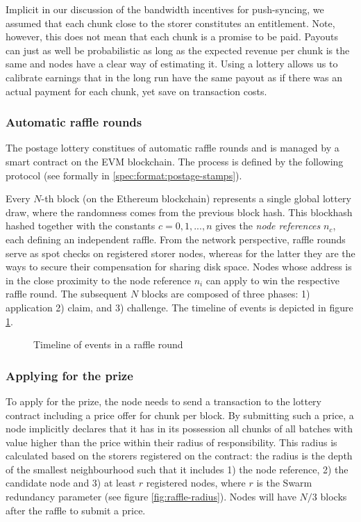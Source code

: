 Implicit in our discussion of the bandwidth incentives for push-syncing, we assumed that  each chunk close to the storer constitutes an entitlement. Note, however, this does not mean that each chunk is a promise to be paid. Payouts can just as well be probabilistic as long as the expected revenue per chunk is the same and nodes have a clear way of estimating it. Using a lottery allows us to calibrate earnings that in the long run have the same payout as if there was an actual payment for each chunk, yet save on transaction costs.


\subsubsection{Automatic raffle rounds}

The postage lottery constitues of automatic raffle rounds and is managed by a smart contract on the EVM blockchain. The process is defined by the following protocol (see formally in \ref{spec:format:postage-stamps}). 

Every $N$-th block (on the Ethereum blockchain) represents a single global lottery draw, where the randomness comes from the previous block hash. This blockhash hashed together with the constants $c=0, 1, ..., n$ gives the \emph{node references} $n_c$, each defining an independent raffle.  From the network perspective, raffle rounds serve as spot checks on registered storer nodes, whereas for the latter they are the ways to secure their compensation for sharing disk space. 
Nodes whose address is in the close proximity to the node reference $n_i$ can apply to win the respective raffle round. The subsequent $N$ blocks are composed of three phases: 1) application 2) claim, and 3) challenge. The timeline of events is depicted in figure \ref{fig:raffle-timeline}.

\begin{figure}[htbp]
  \centering
  \caption[Timeline of events in a raffle round]{Timeline of events in a raffle round}
  \label{fig:raffle-timeline}
\end{figure}


\subsubsection{Applying for the prize}

To apply for the prize, the node needs to send a transaction to the lottery contract including a price offer for chunk per block. By submitting such a price, a node implicitly declares that it has in its possession all chunks of all batches with value higher than the price within their radius of responsibility. This radius is calculated based on the storers registered on the contract: the radius is the depth of the smallest neighbourhood such that it includes 1) the node reference, 2) the candidate node and 3) at least $r$ registered nodes, where $r$ is the Swarm  redundancy parameter (see figure \ref{fig:raffle-radius}). Nodes will have $N/3$ blocks after the raffle to submit a price.

